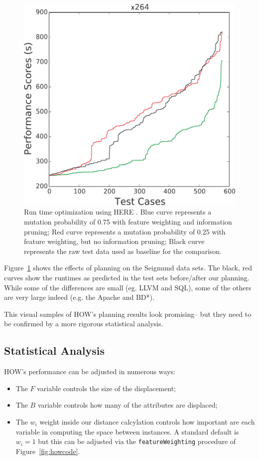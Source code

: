 \documentclass[conference]{IEEEtran}
\newcommand{\bi}{\begin{itemize}}
\newcommand{\ei}{\end{itemize}}
\newcommand{\fig}[1]{Figure~\ref{fig:#1}}
\begin{document}
\begin{figure}[htbp!]
\begin{minipage}{0.30\linewidth}
\end{minipage}
\begin{minipage}{0.30\linewidth}
\includegraphics[width=\linewidth]{figs/X264.pdf}
\end{minipage}
\caption{Run time optimization using HERE . Blue curve represents a mutation probability of 0.75 with feature weighting and information pruning; Red curve represents a mutation probability of 0.25 with feature weighting, but no information pruning; Black curve represents the raw test data used as baseline for the comparison.}
\label{fig:pp}
\end{figure}

\fig{pp} shows the effects of planning on the Seigmund data sets. The black, red %
curves show the
runtimes as predicted in the test sets before/after our planning.  While some of the differences
are small (eg. LLVM and SQL), some of the others are very large indeed (e.g. the Apache and   BD*).
 
This visual samples of HOW's planning results look promising-- but they need to be confirmed by a
 more rigorous statistical analysis.
 
\subsection{Statistical Analysis}

HOW's performance can be adjusted in numerous ways:
\bi
\item The $F$ variable controls the size of the displacement;
\item The $B$ variable controls how many of the attributes are displaced;
\item The $w_i$ weight inside our distance calcylation controls how important are each variable in computing
     the space between instances. A standard default is $w_i=1$ but this can be adjusted via
     the {\tt featureWeighting} procedure of \fig{howcode}.
\ei
\end{document}

